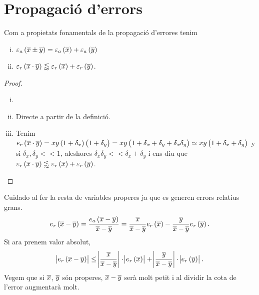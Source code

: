 \section{Propagació d'errors}

\begin{prop}
  Com a propietats fonamentals de la propagació d'errores tenim
  \begin{enumerate}[i)]
    \item $\varepsilon_a\left( \overline{x} \pm \overline{y}\right)  = \varepsilon_a\left( \overline{x}\right)  + \varepsilon_a\left( \overline{y}\right)$
    \item $\varepsilon_r\left( \overline{x}\cdot\overline{y}\right)  \lessapprox \varepsilon_r\left( \overline{x}\right)  + \varepsilon_r\left( \overline{y}\right)$.
  \end{enumerate}
\end{prop}
\begin{proof}
  \begin{enumerate}[i)]
   \item []
   \item Directe a partir de la definició.
   \item Tenim $e_r\left( \overline{x}\cdot\overline{y}\right)  = xy\left( 1+\delta_x\right) \left( 1+\delta_y\right)  = xy\left( 1 + \delta_x + \delta_y + \delta_x\delta_y\right)  \simeq xy\left( 1 + \delta_x + \delta_y\right)$ y si $\delta_x,\delta_y << 1$, aleshores $\delta_x\delta_y << \delta_x + \delta_y$ i ens diu que $\varepsilon_r\left( \overline{x}\cdot\overline{y}\right)  \lessapprox \varepsilon_r\left( \overline{x}\right)  + \varepsilon_r\left( \overline{y}\right)$.
  \end{enumerate}
\end{proof}

\begin{obs}
    Cuidado al fer la resta de variables properes ja que es generen errors relatius grans.
    \[
	e_r\left( \overline{x}-\overline{y}\right)  = \dfrac{e_a\left( \overline{x} - \overline{y}\right) }{\overline{x}-\overline{y}} = \dfrac{\overline{x}}{\overline{x}-\overline{y}}e_r\left( \overline{x}\right)  - \dfrac{\overline{y}}{\overline{x}-\overline{y}}e_r\left( \overline{y}\right).
    \]
    Si ara prenem valor absolut,
    \[
	\abs{e_r\left( \overline{x}-\overline{y}\right)} \leq \abs{\dfrac{\overline{x}}{\overline{x}-\overline{y}}}\cdot\abs{e_r\left( \overline{x}\right)} + \abs{\dfrac{\overline{y}}{\overline{x}-\overline{y}}}\cdot\abs{e_r\left( \overline{y}\right)}.
    \]
    Vegem que si $\overline{x}$, $\overline{y}$ són properes, $\overline{x}-\overline{y}$ serà molt petit i al dividir la cota de l'error augmentarà molt.
\end{obs}

